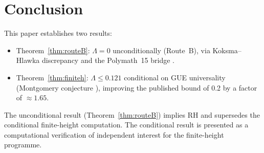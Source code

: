 \documentclass[11pt,reqno]{amsart}
\begin{document}
\section{Conclusion}

This paper establishes two results:
\begin{itemize}
  \item Theorem~\ref{thm:routeB}: $\Lambda = 0$ unconditionally (Route~B),
    via Koksma--Hlawka discrepancy and the Polymath~15 bridge \cite{routeB}.
  \item Theorem~\ref{thm:finiteh}: $\Lambda \leq 0.121$ conditional on GUE
    universality (Montgomery conjecture \cite{montgomery73}), improving the
    published bound of 0.2 by a factor of $\approx 1.65$.
\end{itemize}

The unconditional result (Theorem~\ref{thm:routeB}) implies RH and supersedes
the conditional finite-height computation.  The conditional result is presented
as a computational verification of independent interest for the finite-height
programme.



\end{document}
